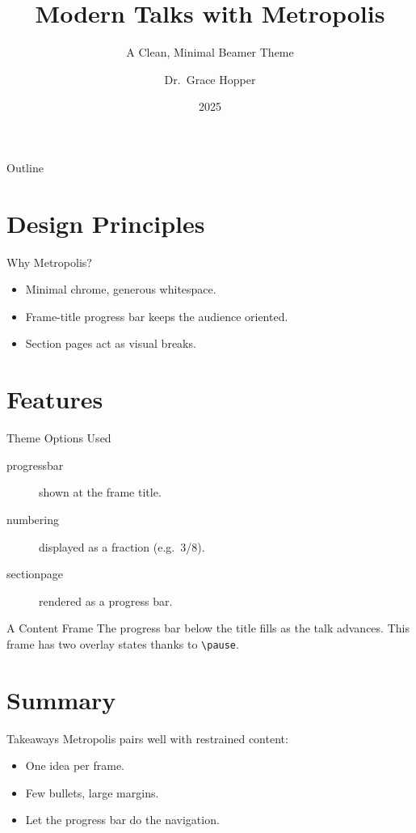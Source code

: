 \documentclass{beamer}
\title{Modern Talks with Metropolis}
\subtitle{A Clean, Minimal Beamer Theme}
\author{Dr.~Grace Hopper}
\institute{Institute of Computing}
\date{2025}
\begin{document}
\maketitle

\begin{frame}{Outline}
  \tableofcontents
\end{frame}

\section{Design Principles}

\begin{frame}{Why Metropolis?}
  \begin{itemize}
    \item Minimal chrome, generous whitespace.
    \item Frame-title progress bar keeps the audience oriented.
    \item Section pages act as visual breaks.
  \end{itemize}
\end{frame}

\section{Features}

\begin{frame}{Theme Options Used}
  \begin{description}
    \item[progressbar] shown at the frame title.
    \item[numbering] displayed as a fraction (e.g.\ 3/8).
    \item[sectionpage] rendered as a progress bar.
  \end{description}
\end{frame}

\begin{frame}{A Content Frame}
  The progress bar below the title fills as the talk advances.
  \pause
  This frame has two overlay states thanks to \texttt{\textbackslash pause}.
\end{frame}

\section{Summary}

\begin{frame}{Takeaways}
  Metropolis pairs well with restrained content:
  \begin{itemize}
    \item One idea per frame.
    \item Few bullets, large margins.
    \item Let the progress bar do the navigation.
  \end{itemize}
\end{frame}
\end{document}
